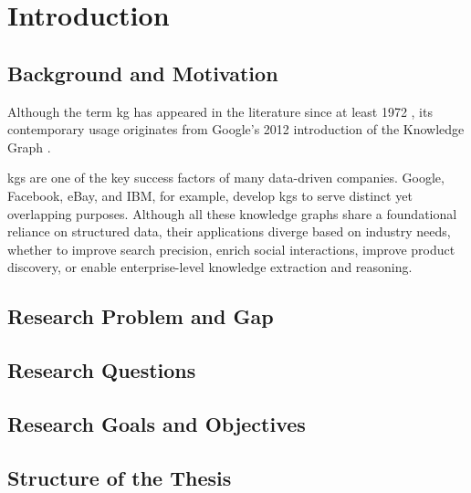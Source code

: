 \section{Introduction}
\subsection{Background and Motivation}
Although the term \gls{kg} has appeared in the literature since at least 1972 \cite{schneider_course_1973}, its contemporary usage originates from Google's 2012 introduction of the Knowledge Graph \cite{singhal_introducing_2012}.

\glspl{kg} are one of the key success factors of many data-driven companies. Google, Facebook, eBay, and IBM, for example, develop \glspl{kg} to serve distinct yet overlapping purposes. Although all these knowledge graphs share a foundational reliance on structured data, their applications diverge based on industry needs, whether to improve search precision, enrich social interactions, improve product discovery, or enable enterprise-level knowledge extraction and reasoning. \cite{aggourCompoundKnowledgeGraphEnabled2022IntegrMaterManufInnov} 




\subsection{Research Problem and Gap}

\subsection{Research Questions}


\subsection{Research Goals and Objectives}
\subsection{Structure of the Thesis}
